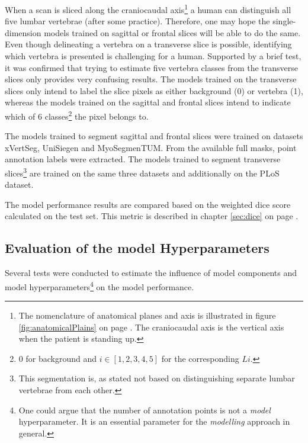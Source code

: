 \par{
    When a scan is sliced along the craniocaudal axis\footnote{
        The nomenclature of anatomical planes and axis is illustrated in figure \ref{fig:anatomicalPlains} on page \pageref{fig:anatomicalPlains}.
        The craniocaudal axis is the vertical axis when the patient is standing up.} 
    a human can distinguish all five lumbar vertebrae (after some practice).
    Therefore, one may hope the single-dimension models trained on sagittal or frontal slices will be able to do the same.
    Even though delineating a vertebra on a transverse slice is possible, identifying which vertebra is presented is challenging for a human.
    Supported by a brief test, it was confirmed that trying to estimate five vertebra classes from the transverse slices only provides very confusing results.
    The models trained on the transverse slices only intend to label the slice pixels as either background (0) or vertebra (1), 
    whereas the models trained on the sagittal and frontal slices intend to indicate which of 6 classes\footnote{0 for background and $i\in [1,2,3,4,5]$ for the corresponding $L i $.} the pixel belongs to.
}
\par{
    The models trained to segment sagittal and frontal slices were trained on datasets xVertSeg, UniSiegen and MyoSegmenTUM.
    From the available full masks, point annotation labels were extracted.
    The models trained to segment transverse slices\footnote{This segmentation is, as stated not based on distinguishing separate lumbar vertebrae from each other.} 
    are trained on the same three datasets and additionally on the PLoS dataset.    
}
\par{
    The model performance results are compared based on the weighted dice score calculated on the test set.
    This metric is described in chapter \ref{sec:dice} on page \pageref{sec:dice}.
}
\subsection{Evaluation of the model Hyperparameters}
\par{
    Several tests were conducted to estimate the influence of model components and model hyperparameters\footnote{
        One could argue that the number of annotation points is not a \textit{model} hyperparameter. It is an essential parameter for the \textit{modelling} approach in general.
    } on the model performance.
}
